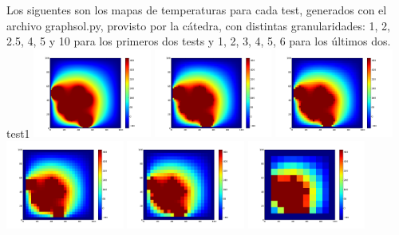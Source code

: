\documentclass[spanish,a4paper]{article}
\begin{document}
Los siguentes son los mapas de temperaturas para cada test, generados con el archivo graphsol.py, provisto por la cátedra, con distintas granularidades: 1, 2, 2.5, 4, 5 y 10 para los primeros dos tests y 1, 2, 3, 4, 5, 6 para los últimos dos.
test1 \newline
\includegraphics[width=110pt]{Parabrisas1-1.png} \includegraphics[width=110pt]{Parabrisas1-2.png} \includegraphics[width=110pt]{Parabrisas1-2,5.png} \newline \includegraphics[width=110pt]{Parabrisas1-4.png} \includegraphics[width=110pt]{Parabrisas1-5.png} \includegraphics[width=110pt]{Parabrisas1-10.png} \newline
\end{document}
